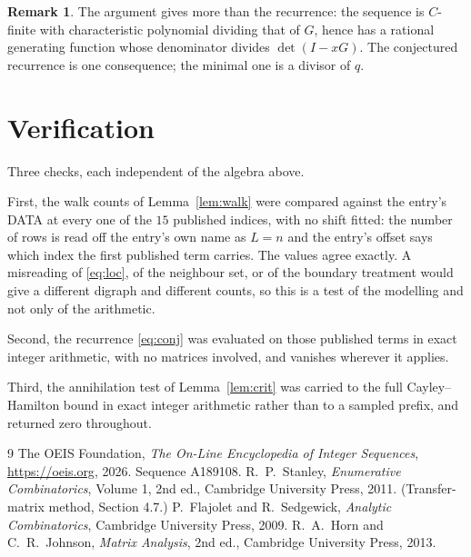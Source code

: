 \documentclass[11pt,a4paper]{article}
\theoremstyle{plain}
\theoremstyle{definition}
\newtheorem{remark}[theorem]{Remark}
\begin{document}
\begin{remark}
The argument gives more than the recurrence: the sequence is $C$-finite with characteristic
polynomial dividing that of $G$, hence has a rational generating function whose denominator
divides $\det(I-xG)$. The conjectured recurrence is one consequence; the minimal one is a
divisor of $q$.
\end{remark}

\section{Verification}

Three checks, each independent of the algebra above.

First, the walk counts of Lemma~\ref{lem:walk} were compared against the entry's DATA at
every one of the $15$ published indices, with no shift fitted: the number of rows is
read off the entry's own name as $L=n$ and the entry's offset says which index the first
published term carries. The values agree exactly. A misreading of \eqref{eq:loc}, of the
neighbour set, or of the boundary treatment would give a different digraph and different
counts, so this is a test of the modelling and not only of the arithmetic.

Second, the recurrence \eqref{eq:conj} was evaluated on those published terms in exact
integer arithmetic, with no matrices involved, and vanishes wherever it applies.

Third, the annihilation test of Lemma~\ref{lem:crit} was carried to the full
Cayley--Hamilton bound in exact integer arithmetic rather than to a sampled prefix, and
returned zero throughout.

\begin{thebibliography}{9}
 The OEIS Foundation, \emph{The On-Line Encyclopedia of Integer
Sequences}, \url{https://oeis.org}, 2026. Sequence A189108.
 R.~P.~Stanley, \emph{Enumerative Combinatorics}, Volume 1, 2nd ed.,
Cambridge University Press, 2011. (Transfer-matrix method, Section 4.7.)
 P.~Flajolet and R.~Sedgewick, \emph{Analytic Combinatorics}, Cambridge
University Press, 2009.
 R.~A.~Horn and C.~R.~Johnson, \emph{Matrix Analysis}, 2nd ed., Cambridge
University Press, 2013.
\end{thebibliography}
\end{document}
